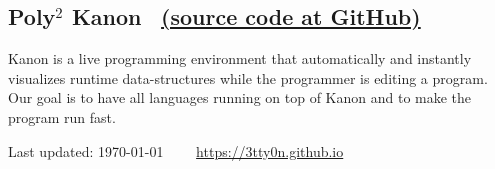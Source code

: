\documentclass[11pt]{article} %
\newcommand{\伊澤侑祐}{\underline{伊澤侑祐}}
\begin{document}
\medskip

\subsection*{Poly$^2$ Kanon \,
  \href{https://github.com/prg-titech/Kanon}{(source code at GitHub)}}

Kanon is a live programming environment that automatically and instantly
visualizes runtime data-structures while the programmer is editing a
program. Our goal is to have all languages running on top of Kanon and to make
the program run fast.


\vfill %


\begin{center}
  \scriptsize
  Last updated: \today~~\raisebox{-0.5pt}{\textbullet}~~
  \href{https://3tty0n.github.io}{https://3tty0n.github.io}
\end{center}

\end{document}
